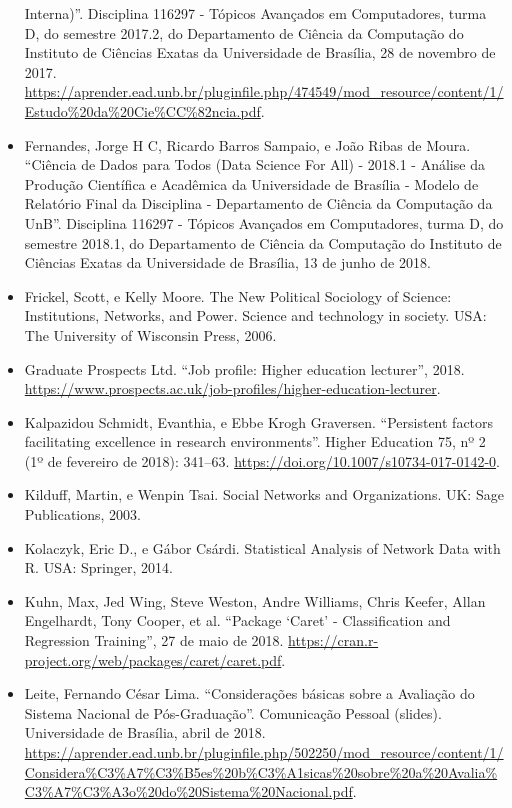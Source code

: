 \documentclass[]{article}
\begin{document}
\begin{itemize}
  Interna)''. Disciplina 116297 - Tópicos Avançados em Computadores,
  turma D, do semestre 2017.2, do Departamento de Ciência da Computação
  do Instituto de Ciências Exatas da Universidade de Brasília, 28 de
  novembro de 2017.
  \url{https://aprender.ead.unb.br/pluginfile.php/474549/mod_resource/content/1/Estudo\%20da\%20Cie\%CC\%82ncia.pdf}.
\item
  Fernandes, Jorge H C, Ricardo Barros Sampaio, e João Ribas de Moura.
  ``Ciência de Dados para Todos (Data Science For All) - 2018.1 -
  Análise da Produção Científica e Acadêmica da Universidade de Brasília
  - Modelo de Relatório Final da Disciplina - Departamento de Ciência da
  Computação da UnB''. Disciplina 116297 - Tópicos Avançados em
  Computadores, turma D, do semestre 2018.1, do Departamento de Ciência
  da Computação do Instituto de Ciências Exatas da Universidade de
  Brasília, 13 de junho de 2018.
\item
  Frickel, Scott, e Kelly Moore. The New Political Sociology of Science:
  Institutions, Networks, and Power. Science and technology in society.
  USA: The University of Wisconsin Press, 2006.
\item
  Graduate Prospects Ltd. ``Job profile: Higher education lecturer'',
  2018.
  \url{https://www.prospects.ac.uk/job-profiles/higher-education-lecturer}.
\item
  Kalpazidou Schmidt, Evanthia, e Ebbe Krogh Graversen. ``Persistent
  factors facilitating excellence in research environments''. Higher
  Education 75, nº 2 (1º de fevereiro de 2018): 341--63.
  \url{https://doi.org/10.1007/s10734-017-0142-0}.
\item
  Kilduff, Martin, e Wenpin Tsai. Social Networks and Organizations. UK:
  Sage Publications, 2003.
\item
  Kolaczyk, Eric D., e Gábor Csárdi. Statistical Analysis of Network
  Data with R. USA: Springer, 2014.
\item
  Kuhn, Max, Jed Wing, Steve Weston, Andre Williams, Chris Keefer, Allan
  Engelhardt, Tony Cooper, et al. ``Package `Caret' - Classification and
  Regression Training'', 27 de maio de 2018.
  \url{https://cran.r-project.org/web/packages/caret/caret.pdf}.
\item
  Leite, Fernando César Lima. ``Considerações básicas sobre a Avaliação
  do Sistema Nacional de Pós-Graduação''. Comunicação Pessoal (slides).
  Universidade de Brasília, abril de 2018.
  \url{https://aprender.ead.unb.br/pluginfile.php/502250/mod_resource/content/1/Considera\%C3\%A7\%C3\%B5es\%20b\%C3\%A1sicas\%20sobre\%20a\%20Avalia\%C3\%A7\%C3\%A3o\%20do\%20Sistema\%20Nacional.pdf}.

\end{itemize}
\end{document}
